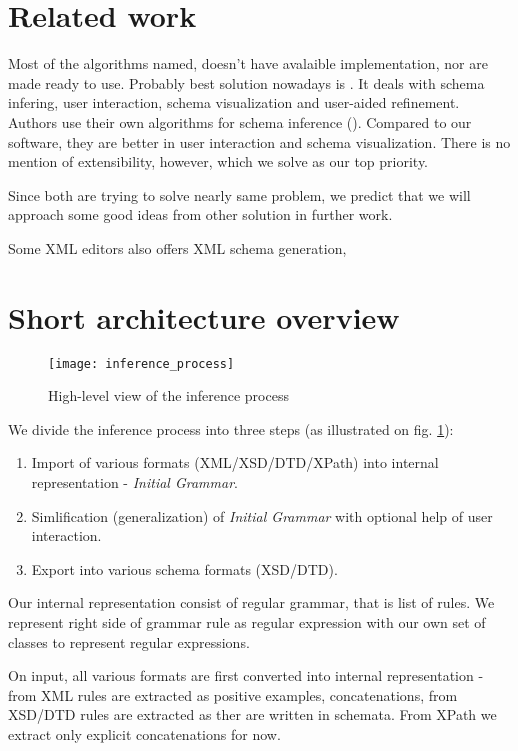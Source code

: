 \documentclass[a4paper,8pt,oneside,twocolumn]{article}
\newcommand{\myscale}{0.74}
\begin{document}
\section*{Related work}
Most of the algorithms named, doesn't have avalaible implementation, nor are made ready to use.
Probably best solution nowadays is \cite{Bex:2008:SSI:1376616.1376750}.
It deals with schema infering, user interaction, schema visualization and user-aided refinement.
Authors use their own algorithms for schema inference (\cite{Bex:2006:ICD:1182635.1164139, Bex:2007:IXS:1325851.1325964}).
Compared to our software, they are better in user interaction and schema visualization.
There is no mention of extensibility, however, which we solve as our top priority.

Since both are trying to solve nearly same problem, we predict that we will approach some good ideas from other solution in further work.

Some XML editors also offers XML schema generation, 

\section*{Short architecture overview}
\begin{figure}
	\centering\texttt{[image: inference\_process]}
	\caption{High-level view of the inference process} \label{inference_process}
\end{figure}
We divide the inference process into three steps (as illustrated on fig. \ref{inference_process}):
\begin{enumerate}
	\item Import of various formats (XML/XSD/DTD/XPath) into internal representation - \emph{Initial Grammar}.
	\item Simlification (generalization) of \emph{Initial Grammar} with optional help of user interaction.
	\item Export into various schema formats (XSD/DTD).
\end{enumerate}	
Our internal representation consist of regular grammar, that is list of rules.
We represent right side of grammar rule as regular expression with our own set of classes to represent regular expressions.

On input, all various formats are first converted into internal representation - from XML rules are extracted as positive examples, concatenations, from XSD/DTD rules are extracted as ther are written in schemata. From XPath we extract only explicit concatenations for now.
\end{document}
